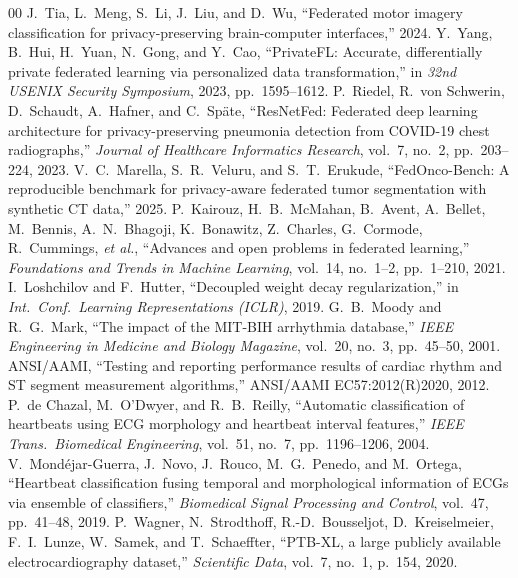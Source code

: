 \documentclass[conference]{IEEEtran}
\begin{document}
\begin{thebibliography}{00}
 J.~Tia, L.~Meng, S.~Li, J.~Liu, and D.~Wu, ``Federated motor imagery classification for privacy-preserving brain-computer interfaces,'' 2024.
 Y.~Yang, B.~Hui, H.~Yuan, N.~Gong, and Y.~Cao, ``PrivateFL: Accurate, differentially private federated learning via personalized data transformation,'' in \emph{32nd USENIX Security Symposium}, 2023, pp.\ 1595--1612.
 P.~Riedel, R.~von Schwerin, D.~Schaudt, A.~Hafner, and C.~Sp\"{a}te, ``ResNetFed: Federated deep learning architecture for privacy-preserving pneumonia detection from COVID-19 chest radiographs,'' \emph{Journal of Healthcare Informatics Research}, vol.~7, no.~2, pp.\ 203--224, 2023.
 V.~C.~Marella, S.~R.~Veluru, and S.~T.~Erukude, ``FedOnco-Bench: A reproducible benchmark for privacy-aware federated tumor segmentation with synthetic CT data,'' 2025.
 P.~Kairouz, H.~B.~McMahan, B.~Avent, A.~Bellet, M.~Bennis, A.~N.~Bhagoji, K.~Bonawitz, Z.~Charles, G.~Cormode, R.~Cummings, \emph{et al.}, ``Advances and open problems in federated learning,'' \emph{Foundations and Trends in Machine Learning}, vol.~14, no.~1--2, pp.\ 1--210, 2021.
 I.~Loshchilov and F.~Hutter, ``Decoupled weight decay regularization,'' in \emph{Int.\ Conf.\ Learning Representations (ICLR)}, 2019.
 G.~B.~Moody and R.~G.~Mark, ``The impact of the MIT-BIH arrhythmia database,'' \emph{IEEE Engineering in Medicine and Biology Magazine}, vol.~20, no.~3, pp.\ 45--50, 2001.
 ANSI/AAMI, ``Testing and reporting performance results of cardiac rhythm and ST segment measurement algorithms,'' ANSI/AAMI EC57:2012(R)2020, 2012.
 P.~de Chazal, M.~O'Dwyer, and R.~B.~Reilly, ``Automatic classification of heartbeats using ECG morphology and heartbeat interval features,'' \emph{IEEE Trans.\ Biomedical Engineering}, vol.~51, no.~7, pp.\ 1196--1206, 2004.
 V.~Mond\'{e}jar-Guerra, J.~Novo, J.~Rouco, M.~G.~Penedo, and M.~Ortega, ``Heartbeat classification fusing temporal and morphological information of ECGs via ensemble of classifiers,'' \emph{Biomedical Signal Processing and Control}, vol.~47, pp.\ 41--48, 2019.
 P.~Wagner, N.~Strodthoff, R.-D.~Bousseljot, D.~Kreiselmeier, F.~I.~Lunze, W.~Samek, and T.~Schaeffter, ``PTB-XL, a large publicly available electrocardiography dataset,'' \emph{Scientific Data}, vol.~7, no.~1, p.~154, 2020.
\end{thebibliography}
\end{document}
